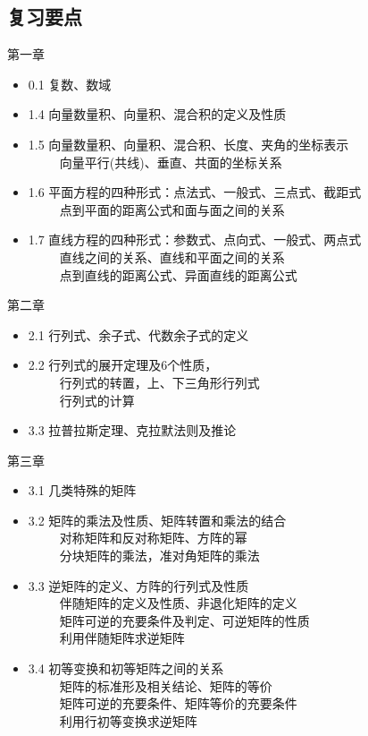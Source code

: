 \documentclass[compress,mathserif,cjk]{beamer}
\theoremstyle{remark}
\numberwithin{equation}{section}
\begin{document}
\begin{CJK}{UTF8}{gbsn}
\section{复习要点}
\begin{frame}{第一章}
\begin{itemize}
  \item 0.1 复数、数域
  \item 1.4 向量数量积、向量积、混合积的定义及性质
  \item 1.5 向量数量积、向量积、混合积、长度、夹角的坐标表示\\
  \ \ \ \ \ 向量平行(共线)、垂直、共面的坐标关系
  \item 1.6 平面方程的四种形式：点法式、一般式、三点式、截距式\\
  \ \ \ \ \ 点到平面的距离公式和面与面之间的关系
  \item 1.7 直线方程的四种形式：参数式、点向式、一般式、两点式\\
  \ \ \ \ \ 直线之间的关系、直线和平面之间的关系\\
  \ \ \ \ \ 点到直线的距离公式、异面直线的距离公式
\end{itemize}
\end{frame}

\begin{frame}{第二章}
\begin{itemize}
  \item 2.1 行列式、余子式、代数余子式的定义
  \item 2.2 行列式的展开定理及6个性质，\\
  \ \ \ \ \ 行列式的转置，上、下三角形行列式\\
  \ \ \ \ \ 行列式的计算
  \item 3.3 拉普拉斯定理、克拉默法则及推论
\end{itemize}
\end{frame}

\begin{frame}{第三章}
\begin{itemize}
  \item 3.1 几类特殊的矩阵
  \item 3.2 矩阵的乘法及性质、矩阵转置和乘法的结合\\
  \ \ \ \ \ 对称矩阵和反对称矩阵、方阵的幂\\
  \ \ \ \ \ 分块矩阵的乘法，准对角矩阵的乘法
  \item 3.3 逆矩阵的定义、方阵的行列式及性质\\
  \ \ \ \ \ 伴随矩阵的定义及性质、非退化矩阵的定义\\
  \ \ \ \ \ 矩阵可逆的充要条件及判定、可逆矩阵的性质\\
  \ \ \ \ \ 利用伴随矩阵求逆矩阵\\
  \item 3.4 初等变换和初等矩阵之间的关系\\
  \ \ \ \ \ 矩阵的标准形及相关结论、矩阵的等价\\
  \ \ \ \ \ 矩阵可逆的充要条件、矩阵等价的充要条件\\
  \ \ \ \ \ 利用行初等变换求逆矩阵
\end{itemize}
\end{frame}


\end{CJK}
\end{document}
